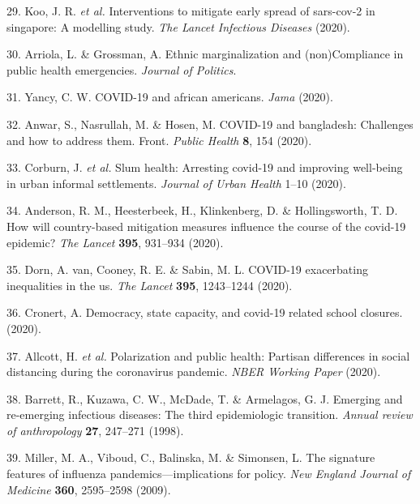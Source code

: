 \documentclass[]{article}
\begin{document}
\begin{cslreferences}
\leavevmode\hypertarget{ref-koo2020interventions}{}%
29. Koo, J. R. \emph{et al.} Interventions to mitigate early spread of sars-cov-2 in singapore: A modelling study. \emph{The Lancet Infectious Diseases} (2020).

\leavevmode\hypertarget{ref-arriola2020}{}%
30. Arriola, L. \& Grossman, A. Ethnic marginalization and (non)Compliance in public health emergencies. \emph{Journal of Politics}.

\leavevmode\hypertarget{ref-yancy2020covid}{}%
31. Yancy, C. W. COVID-19 and african americans. \emph{Jama} (2020).

\leavevmode\hypertarget{ref-anwar2020covid}{}%
32. Anwar, S., Nasrullah, M. \& Hosen, M. COVID-19 and bangladesh: Challenges and how to address them. Front. \emph{Public Health} \textbf{8}, 154 (2020).

\leavevmode\hypertarget{ref-corburn2020slum}{}%
33. Corburn, J. \emph{et al.} Slum health: Arresting covid-19 and improving well-being in urban informal settlements. \emph{Journal of Urban Health} 1--10 (2020).

\leavevmode\hypertarget{ref-anderson2020will}{}%
34. Anderson, R. M., Heesterbeek, H., Klinkenberg, D. \& Hollingsworth, T. D. How will country-based mitigation measures influence the course of the covid-19 epidemic? \emph{The Lancet} \textbf{395}, 931--934 (2020).

\leavevmode\hypertarget{ref-van2020covid}{}%
35. Dorn, A. van, Cooney, R. E. \& Sabin, M. L. COVID-19 exacerbating inequalities in the us. \emph{The Lancet} \textbf{395}, 1243--1244 (2020).

\leavevmode\hypertarget{ref-cronert2020democracy}{}%
36. Cronert, A. Democracy, state capacity, and covid-19 related school closures. (2020).

\leavevmode\hypertarget{ref-allcott2020polarization}{}%
37. Allcott, H. \emph{et al.} Polarization and public health: Partisan differences in social distancing during the coronavirus pandemic. \emph{NBER Working Paper} (2020).

\leavevmode\hypertarget{ref-barrett1998emerging}{}%
38. Barrett, R., Kuzawa, C. W., McDade, T. \& Armelagos, G. J. Emerging and re-emerging infectious diseases: The third epidemiologic transition. \emph{Annual review of anthropology} \textbf{27}, 247--271 (1998).

\leavevmode\hypertarget{ref-miller2009signature}{}%
39. Miller, M. A., Viboud, C., Balinska, M. \& Simonsen, L. The signature features of influenza pandemics---implications for policy. \emph{New England Journal of Medicine} \textbf{360}, 2595--2598 (2009).


\end{cslreferences}
\end{document}
